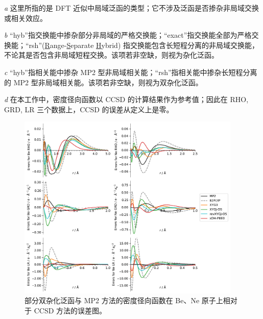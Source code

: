\begin{landscape}
\footnotesize
\vspace{-1em}
\par\noindent\emph{a} 这里所指的是 DFT 近似中局域泛函的类型；它不涉及泛函是否掺杂非局域交换或相关效应。
\par\noindent\emph{b} “hyb”指交换能中掺杂部分非局域的严格交换能；“exact”指交换能全部为严格交换能；“rsh”(\underline{R}ange-\underline{S}eparate \underline{H}ybrid) 指交换能包含长短程分离的非局域交换能，不论其是否包含非局域短程交换。该项若非空缺，则视为杂化泛函。
\par\noindent\emph{c} “hyb”指相关能中掺杂 MP2 型非局域相关能；“rsh”指相关能中掺杂长短程分离的 MP2 型非局域相关能。该项若非空缺，则视为双杂化泛函。
\par\noindent\emph{d} 在本工作中，密度径向函数以 CCSD 的计算结果作为参考值；因此在 RHO, GRD, LR 三个数据上，CCSD 的误差从定义上是零。
\end{landscape}

\begin{figure}[hp]
    \centering
    \includegraphics[width=0.95\textwidth]{assets/supp-fig-s1.pdf}
    \caption{部分双杂化泛函与 MP2 方法的密度径向函数在 Be、Ne 原子上相对于 CCSD 方法的误差图。}
    \label{fig.4.supp-fig-s1}
\end{figure}

